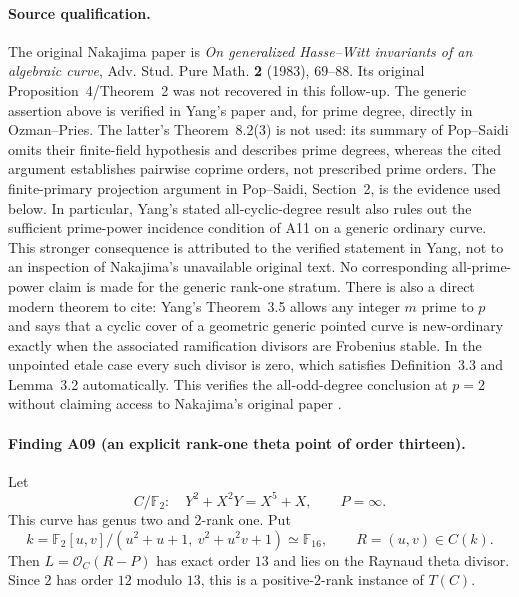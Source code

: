 \paragraph{Source qualification.}
The original Nakajima paper is \emph{On generalized Hasse--Witt
invariants of an algebraic curve}, Adv. Stud. Pure Math.
\textbf{2} (1983), 69--88. Its original Proposition~4/Theorem~2 was
not recovered in this follow-up. The generic assertion above is
verified in Yang's paper and, for prime degree, directly in
Ozman--Pries. The latter's Theorem~8.2(3) is not used: its summary of
Pop--Saidi omits their finite-field hypothesis and describes prime
degrees, whereas the cited argument establishes pairwise coprime
orders, not prescribed prime orders. The finite-primary projection
argument in Pop--Saidi, Section~2, is the evidence used below.
\cite[Propositions~2.1,2.3 and their proofs, pp.~112--114]{PopSaidi}
In particular, Yang's stated all-cyclic-degree result also rules
out the sufficient prime-power incidence condition of A11 on a
generic ordinary curve. This stronger consequence is attributed to
the verified statement in Yang, not to an inspection of Nakajima's
unavailable original text. No corresponding all-prime-power claim
is made for the generic rank-one stratum.
There is also a direct modern theorem to cite: Yang's
Theorem~3.5 allows any integer $m$ prime to $p$ and says that a
cyclic cover of a geometric generic pointed curve is new-ordinary
exactly when the associated ramification divisors are Frobenius
stable. In the unpointed etale case every such divisor is zero,
which satisfies Definition~3.3 and Lemma~3.2 automatically.
This verifies the all-odd-degree conclusion at $p=2$ without
claiming access to Nakajima's original paper
\cite[Definition~3.3, Theorem~3.5]{Yang2021}.

\paragraph{Finding A09 (an explicit rank-one theta point of order thirteen).}
Let
\[
 C/\mathbb F_2:\quad Y^2+X^2Y=X^5+X,\qquad P=\infty.
\]
This curve has genus two and $2$-rank one. Put
\[
 k=\mathbb F_2[u,v]/(u^2+u+1,\ v^2+u^2v+1)\simeq\mathbb F_{16},
 \qquad R=(u,v)\in C(k).
\]
Then $L=\mathcal O_C(R-P)$ has exact order $13$ and lies on the
Raynaud theta divisor. Since $2$ has order $12$ modulo $13$,
this is a positive-$2$-rank instance of $T(C)$.

